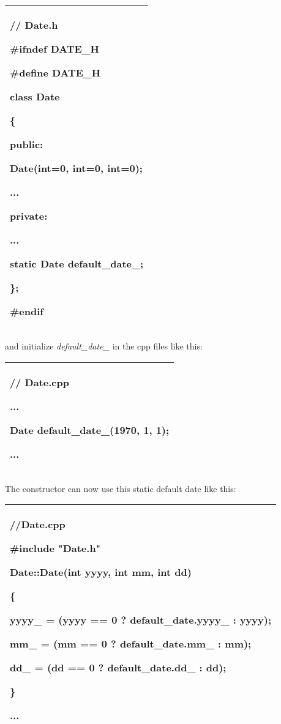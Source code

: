 \documentclass[
]{article}
\begin{document}
\begin{longtable}[]{@{}l@{}}
\toprule
\endhead
\begin{minipage}[t]{0.97\columnwidth}\raggedright
// Date.h

\#ifndef DATE\_H

\#define DATE\_H

class Date

\{

public:

Date(int=0, int=0, int=0);

...

private:

...

\textbf{static Date default\_date\_;}

\};

\#endif\strut
\end{minipage}\tabularnewline
\bottomrule
\end{longtable}

and initialize \emph{default\_date\_} in the cpp files like this:

\begin{longtable}[]{@{}l@{}}
\toprule
\endhead
\begin{minipage}[t]{0.97\columnwidth}\raggedright
// Date.cpp

...

Date default\_date\_(1970, 1, 1);

...\strut
\end{minipage}\tabularnewline
\bottomrule
\end{longtable}

The constructor can now use this static default date like this:

\begin{longtable}[]{@{}l@{}}
\toprule
\endhead
\begin{minipage}[t]{0.97\columnwidth}\raggedright
//Date.cpp

\#include "Date.h"

Date::Date(int yyyy, int mm, int dd)

\{

yyyy\_ = (yyyy == 0 ? default\_date.yyyy\_ : yyyy);

mm\_ = (mm == 0 ? default\_date.mm\_ : mm);

dd\_ = (dd == 0 ? default\_date.dd\_ : dd);

\}

...\strut
\end{minipage}\tabularnewline
\bottomrule
\end{longtable}
\end{document}
